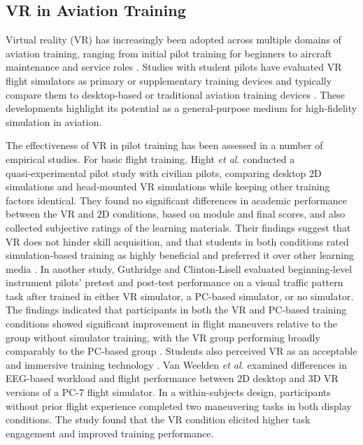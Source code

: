 \documentclass[11pt, a4paper]{article}
\begin{document}
\subsection{VR in Aviation Training}
Virtual reality (VR) has increasingly been adopted across multiple domains of aviation training, ranging from initial pilot training for beginners to aircraft maintenance and service roles \cite{fussell-2020,hight-2022,pena-2025}. Studies with student pilots have evaluated VR flight simulators as primary or supplementary training devices and typically compare them to desktop‑based or traditional aviation training devices \cite{hight-2022,guthridge-2023}. These developments highlight its potential as a general-purpose medium for high-fidelity simulation in aviation.

The effectiveness of VR in pilot training has been assessed in a number of empirical studies. For basic flight training, Hight \emph{et al.} \cite{hight-2022} conducted a quasi‑experimental pilot study with civilian pilots, comparing desktop $2$D simulations and head‑mounted VR simulations while keeping other training factors identical. They found no significant differences in academic performance between the VR and $2$D conditions, based on module and final scores, and also collected subjective ratings of the learning materials. Their findings suggest that VR does not hinder skill acquisition, and that students in both conditions rated simulation‑based training as highly beneficial and preferred it over other learning media \cite{hight-2022}. In another study, Guthridge and Clinton‑Lisell \cite{guthridge-2023} evaluated beginning-level instrument pilots' pretest and post-test performance on a visual traffic pattern task after trained in either VR simulator, a PC-based simulator, or no simulator. The findings indicated that participants in both the VR and PC‑based training conditions showed significant improvement in flight maneuvers relative to the group without simulator training, with the VR group performing broadly comparably to the PC‑based group \cite{guthridge-2023}. Students also perceived VR as an acceptable and immersive training technology \cite{guthridge-2023}. Van Weelden \emph{et al.} \cite{van-weelden-2024} examined differences in EEG-based workload and flight performance between 2D desktop and 3D VR versions of a PC-7 flight simulator. In a within-subjects design, participants without prior flight experience completed two maneuvering tasks in both display conditions. The study found that the VR condition elicited higher task engagement and improved training performance.
\end{document}
